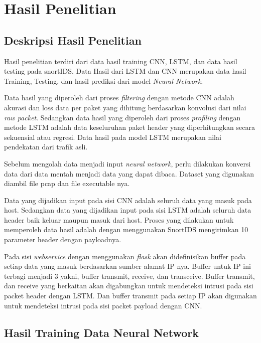 \documentclass[./skripsi.tex]{subfiles}
\begin{document}
\chapter{Hasil Penelitian}
\section{Deskripsi Hasil Penelitian}
\par Hasil penelitian terdiri dari data hasil training CNN, LSTM, dan data hasil testing pada snortIDS. Data Hasil dari LSTM dan CNN merupakan data hasil Training, Testing, dan hasil prediksi dari model \textit{Neural Network}.
\par Data hasil yang diperoleh dari proses \textit{filtering} dengan metode CNN adalah akurasi dan loss data per paket yang dihitung berdasarkan konvolusi dari nilai \textit{raw packet}. Sedangkan data hasil yang diperoleh dari proses \textit{profiling} dengan metode LSTM adalah data keseluruhan paket header yang diperhitungkan secara sekuensial atau regresi. Data hasil pada model LSTM merupakan nilai pendekatan dari trafik asli.
\par Sebelum mengolah data menjadi input \textit{neural network}, perlu dilakukan konversi data dari data mentah menjadi data yang dapat dibaca. Dataset yang digunakan diambil file pcap dan file executable nya.
\par Data yang dijadikan input pada sisi CNN adalah seluruh data yang masuk pada host. Sedangkan data yang dijadikan input pada sisi LSTM adalah seluruh data header baik keluar maupun masuk dari host. Proses yang dilakukan untuk memperoleh data hasil adalah dengan menggunakan SnortIDS mengirimkan 10 parameter header dengan payloadnya.
\par Pada sisi \textit{webservice} dengan menggunakan \textit{flask} akan didefinisikan buffer pada setiap data yang masuk berdasarkan sumber alamat IP nya. Buffer untuk IP ini terbagi menjadi 3 yakni, buffer transmit, receive, dan transceive. Buffer transmit, dan receive yang berkaitan akan digabungkan untuk mendeteksi intrusi pada sisi packet header dengan LSTM. Dan buffer transmit pada setiap IP akan digunakan untuk mendeteksi intrusi pada sisi packet payload dengan CNN.
\clearpage
\section{Hasil Training Data Neural Network}
\end{document}
